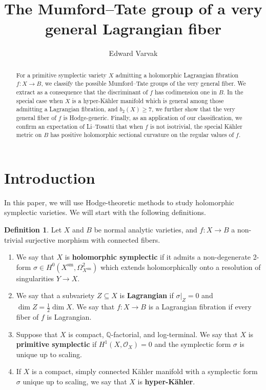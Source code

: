 \documentclass[12pt]{amsart}
\title{The Mumford--Tate group of a very general Lagrangian fiber}
\author{Edward Varvak}
\newcommand{\Q}{\mathbb{Q}}
\theoremstyle{definition}
\newtheorem{definition}[theorem]{Definition}
\numberwithin{equation}{section}
\begin{document}
\begin{abstract}
    For a primitive symplectic variety \(X\) admitting a holomorphic Lagrangian fibration 
    \(f: X \to B\), we classify the possible Mumford--Tate groups of the very 
    general fiber. We extract as a consequence that the discriminant of 
    \(f\) has codimension one in \(B\). In the special case when \(X\) is a hyper-K\"ahler manifold which 
    is general among those admitting a Lagrangian fibration, and \(b_2(X) \geq 7\), 
    we further show that the very general fiber of \(f\) is Hodge-generic. Finally, as an 
    application of our classification, we confirm an expectation of Li--Tosatti that 
    when \(f\) is not isotrivial, the special K\"ahler metric on \(B\) has positive 
    holomorphic sectional curvature on the regular values of \(f\).
\end{abstract}

\maketitle


\section{Introduction}

In this paper, we will use Hodge-theoretic methods to study holomorphic symplectic 
varieties. We will start with the following definitions.

\begin{definition}
    Let \(X\) and \(B\) be normal analytic varieties, and \(f: X \to B\) a non-trivial 
    surjective morphism with connected fibers.
    \begin{enumerate}
        \item We say that \(X\) is {\bf holomorphic symplectic} if it admits a 
        non-degenerate 2-form \(\sigma \in H^0(X^\mathrm{sm}, \Omega_{X^\mathrm{sm}}^2)\) 
        which extends holomorphically onto a resolution of singularities \(Y \to X\).
        \item We say that a subvariety \(Z \subseteq X\) is {\bf Lagrangian} if 
        \(\sigma|_Z = 0\) and \(\dim Z = \frac{1}{2} \dim X\). We say that 
        \(f: X \to B\) is a Lagrangian fibration if every fiber of \(f\) is Lagrangian.
        \item Suppose that \(X\) is compact, \(\Q\)-factorial, and log-terminal. 
        We say that \(X\) is {\bf primitive symplectic} if \(H^1(X, \mathcal{O}_X) = 0\) 
        and the symplectic form \(\sigma\) is unique up to scaling.
        \item If \(X\) is a compact, simply connected K\"ahler manifold with a symplectic 
        form \(\sigma\) unique up to scaling, we say that \(X\) is {\bf hyper-K\"ahler}.
    \end{enumerate}
\end{definition}
\end{document}
